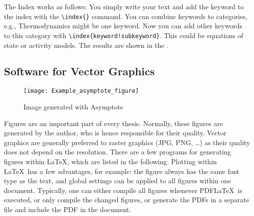 The Index works as follows: You simply write your text and add the keyword to the index with the \verb+\index{}+ command. You can combine keywords to categories, e.g., Thermodynamics might be one keyword. Now you can add other keywords to this category with \verb+\index{keyword!subkeyword}+. This could be equations of state or activity models. The results are shown in the .
\subsection{Software for Vector Graphics}
\begin{wrapfigure}{r}{0.45\textwidth}
\centering
\texttt{[image: Example\_asymptote\_figure]}
	\caption{Image generated with Asymptote}\label{fig:Example_asymptote_figure}
\end{wrapfigure}
Figures are an important part of every thesis. Normally, these figures are generated by the author, who is hence responsible for their quality. Vector graphics are generally preferred to raster graphics (JPG, PNG, \dots) as their quality does not depend on the resolution. There are a few programs for generating figures within \LaTeX, which are listed in the following. Plotting within \LaTeX\ has a few advantages, for example: the figure always has the same font type as the text, and global settings can be applied to all figures within one document. Typically, one can either compile all figures whenever PDF\LaTeX\ is executed, or only compile the changed figures, or generate the PDFs in a separate file and include the PDF in the document.

